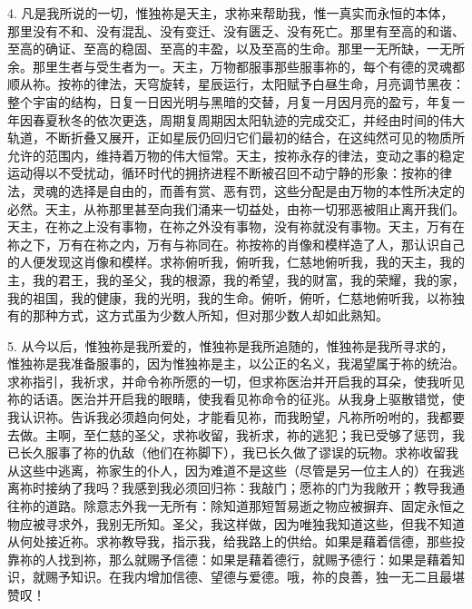 4. 凡是我所说的一切，惟独祢是天主，求祢来帮助我，惟一真实而永恒的本体，那里没有不和、没有混乱、没有变迁、没有匮乏、没有死亡。那里有至高的和谐、至高的确证、至高的稳固、至高的丰盈，以及至高的生命。那里一无所缺，一无所余。那里生者与受生者为一。天主，万物都服事那些服事祢的，每个有德的灵魂都顺从祢。按祢的律法，天穹旋转，星辰运行，太阳赋予白昼生命，月亮调节黑夜：整个宇宙的结构，日复一日因光明与黑暗的交替，月复一月因月亮的盈亏，年复一年因春夏秋冬的依次更迭，周期复周期因太阳轨迹的完成交汇，并经由时间的伟大轨道，不断折叠又展开，正如星辰仍回归它们最初的结合，在这纯然可见的物质所允许的范围内，维持着万物的伟大恒常。天主，按祢永存的律法，变动之事的稳定运动得以不受扰动，循环时代的拥挤进程不断被召回不动宁静的形象：按祢的律法，灵魂的选择是自由的，而善有赏、恶有罚，这些分配是由万物的本性所决定的必然。天主，从祢那里甚至向我们涌来一切益处，由祢一切邪恶被阻止离开我们。天主，在祢之上没有事物，在祢之外没有事物，没有祢就没有事物。天主，万有在祢之下，万有在祢之内，万有与祢同在。祢按祢的肖像和模样造了人，那认识自己的人便发现这肖像和模样。求祢俯听我，俯听我，仁慈地俯听我，我的天主，我的主，我的君王，我的圣父，我的根源，我的希望，我的财富，我的荣耀，我的家，我的祖国，我的健康，我的光明，我的生命。俯听，俯听，仁慈地俯听我，以祢独有的那种方式，这方式虽为少数人所知，但对那少数人却如此熟知。\par

5. 从今以后，惟独祢是我所爱的，惟独祢是我所追随的，惟独祢是我所寻求的，惟独祢是我准备服事的，因为惟独祢是主，以公正的名义，我渴望属于祢的统治。求祢指引，我祈求，并命令祢所愿的一切，但求祢医治并开启我的耳朵，使我听见祢的话语。医治并开启我的眼睛，使我看见祢命令的征兆。从我身上驱散错觉，使我认识祢。告诉我必须趋向何处，才能看见祢，而我盼望，凡祢所吩咐的，我都要去做。主啊，至仁慈的圣父，求祢收留，我祈求，祢的逃犯；我已受够了惩罚，我已长久服事了祢的仇敌（他们在祢脚下），我已长久做了谬误的玩物。求祢收留我从这些中逃离，祢家生的仆人，因为难道不是这些（尽管是另一位主人的）在我逃离祢时接纳了我吗？我感到我必须回归祢：我敲门；愿祢的门为我敞开；教导我通往祢的道路。除意志外我一无所有：除知道那短暂易逝之物应被摒弃、固定永恒之物应被寻求外，我别无所知。圣父，我这样做，因为唯独我知道这些，但我不知道从何处接近祢。求祢教导我，指示我，给我路上的供给。如果是藉着信德，那些投靠祢的人找到祢，那么就赐予信德：如果是藉着德行，就赐予德行：如果是藉着知识，就赐予知识。在我内增加信德、望德与爱德。哦，祢的良善，独一无二且最堪赞叹！\par


